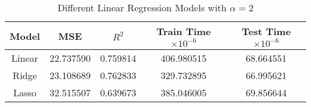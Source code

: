 \begin{table}[H]
\centering
\caption{Different Linear Regression Models with $\alpha = 2$}
\label{tab:modelsA2}
\begin{tabular}{ccccc}
\toprule
Model & MSE & $R^2$ & Train Time $\times 10^{-6}$ & Test Time $\times 10^{-6}$ \\
\midrule
Linear & 22.737590 & 0.759814 & 406.980515 & 68.664551 \\
Ridge & 23.108689 & 0.762833 & 329.732895 & 66.995621 \\
Lasso & 32.515507 & 0.639673 & 385.046005 & 69.856644 \\
\bottomrule
\end{tabular}
\end{table}
